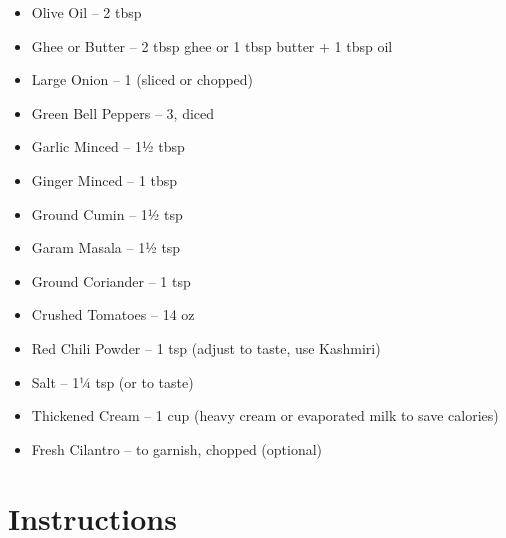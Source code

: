 \begin{itemize}[itemsep=0.1em, label={\raisebox{-0.1ex}{\large\textbullet}}]
      \item[\measure] Olive Oil – 2 tbsp
      \item Ghee or Butter – 2 tbsp ghee or 1 tbsp butter + 1 tbsp oil
      \item[\cut] Large Onion – 1 (sliced or chopped)
      \item[\cut] Green Bell Peppers – 3, diced
      \item[\cut] Garlic Minced – 1½ tbsp
      \item[\cut] Ginger Minced – 1 tbsp
      \item[\measure] Ground Cumin – 1½ tsp
      \item[\measure] Garam Masala – 1½ tsp
      \item[\measure] Ground Coriander – 1 tsp
      \item Crushed Tomatoes – 14 oz
      \item[\measure] Red Chili Powder – 1 tsp (adjust to taste, use Kashmiri)
      \item[\measure] Salt – 1¼ tsp (or to taste)
      \item[\measure] Thickened Cream – 1 cup (heavy cream or evaporated milk to save calories)
      \item[\cut] Fresh Cilantro – to garnish, chopped (optional)
\end{itemize}

\newpage
{}
\section*{Instructions}

